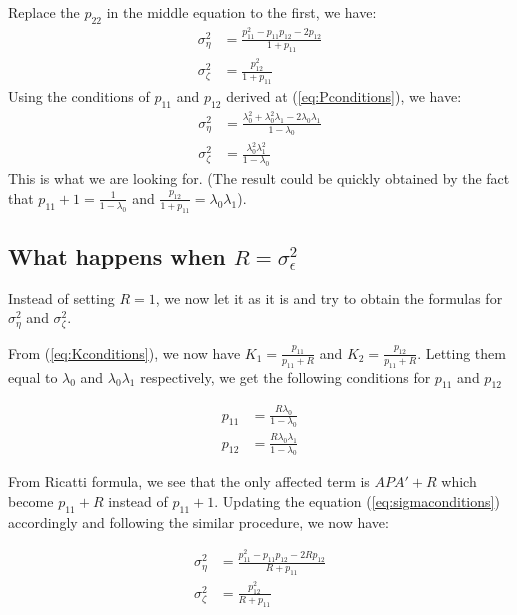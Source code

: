 Replace the $p_{22}$ in the middle equation to the first, we have:
\begin{equation} \label{eq:sigma_solved}
\begin{split}
\sigma_{\eta}^2 &= \frac{p^2_{11}-p_{11}p_{12}-2p_{12}}{1+p_{11}}\\
\sigma_{\zeta}^2 &= \frac{p^2_{12}}{1+p_{11}}
\end{split}
\end{equation}
Using the conditions of $p_{11}$ and $p_{12}$ derived at (\ref{eq:Pconditions}), we have:
\begin{equation} \label{eq:sigma_R1}
\begin{split}
\sigma_{\eta}^2 &= \frac{\lambda^2_0 + \lambda^2_0\lambda_1 - 2\lambda_0\lambda_1}{1-\lambda_0}\\
\sigma_{\zeta}^2 &= \frac{\lambda^2_0\lambda^2_1}{1-\lambda_0}
\end{split}
\end{equation}
This is what we are looking for. (The result could be quickly obtained by the fact that $p_{11}+1 = \frac{1}{1-\lambda_0}$ and $\frac{p_{12}}{1+p_{11}} = \lambda_0\lambda_1$).


\subsection{What happens when $R = \sigma^2_\epsilon$}
Instead of setting $R = 1$, we now let it as it is and try to obtain the formulas for  $\sigma_\eta^2$ and $\sigma_\zeta^2$.

From (\ref{eq:Kconditions}), we now have $K_1 = \frac{p_{11}}{p_{11}+R}$ and $K_2 = \frac{p_{12}}{p_{11}+R}$. Letting them equal to $\lambda_0$ and $\lambda_0\lambda_1$ respectively, we get the following conditions for $p_{11}$ and $p_{12}$

\begin{equation} \label{eq:P_R_conditions}
\begin{split}
p_{11} &= \frac{R\lambda_0}{1-\lambda_0} \\
p_{12} &= \frac{R\lambda_0\lambda_1}{1-\lambda_0}
\end{split}
\end{equation}

From Ricatti formula, we see that the only affected term is $APA'+R$ which become $p_{11}+R$ instead of $p_{11}+1$. Updating the equation (\ref{eq:sigmaconditions}) accordingly and following the similar procedure, we now have:

\begin{equation} \label{eq:P_R_sigma}
\begin{split}
\sigma_{\eta}^2 &= \frac{p^2_{11}-p_{11}p_{12}-2Rp_{12}}{R+p_{11}}\\
\sigma_{\zeta}^2 &= \frac{p^2_{12}}{R+p_{11}}
\end{split}
\end{equation}

